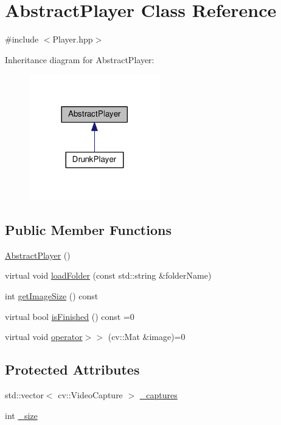 \hypertarget{classAbstractPlayer}{}\section{Abstract\+Player Class Reference}
\label{classAbstractPlayer}


{\ttfamily \#include $<$Player.\+hpp$>$}



Inheritance diagram for Abstract\+Player\+:\nopagebreak
\begin{figure}[H]
\begin{center}
\leavevmode
\includegraphics[width=161pt]{classAbstractPlayer__inherit__graph}
\end{center}
\end{figure}
\subsection*{Public Member Functions}
\begin{DoxyCompactItemize}
\item 
\hyperlink{classAbstractPlayer_a4987602a4b3381a9c592585dde7cf33b}{Abstract\+Player} ()
\item 
virtual void \hyperlink{classAbstractPlayer_a2091b1757bfd13116dfa4612af55473b}{load\+Folder} (const std\+::string \&folder\+Name)
\item 
int \hyperlink{classAbstractPlayer_a8bdc017fb32c90e6635ed6b7491fbe98}{get\+Image\+Size} () const 
\item 
virtual bool \hyperlink{classAbstractPlayer_a841896a599ebe6b8317905de78c44bcc}{is\+Finished} () const =0
\item 
virtual void \hyperlink{classAbstractPlayer_a5c9a863c96224dd297aa44c69010cd94}{operator$>$$>$} (cv\+::\+Mat \&image)=0
\end{DoxyCompactItemize}
\subsection*{Protected Attributes}
\begin{DoxyCompactItemize}
\item 
std\+::vector$<$ cv\+::\+Video\+Capture $>$ \hyperlink{classAbstractPlayer_a72dd2ef25310decd45671a7d51e1f319}{\+\_\+captures}
\item 
int \hyperlink{classAbstractPlayer_a9d8395a141cc985622d4910209bc7d53}{\+\_\+size}
\end{DoxyCompactItemize}


